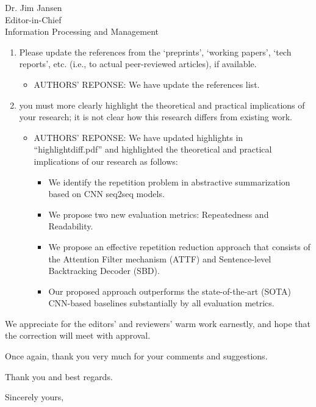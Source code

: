 \documentclass[11pt]{letter} %
\begin{document}
\begin{letter}{Dr. Jim Jansen \\
			Editor-in-Chief  \\
			Information Processing and Management}
\begin{enumerate}
\begin{itemize}
			\end{itemize}
			\item Please update the references from the ‘preprints', ‘working papers’, ‘tech reports’, etc. (i.e., to actual peer-reviewed articles), if available.
			\begin{itemize}
				\item[] AUTHORS' REPONSE: We have update the references list.
			\end{itemize}
			\item you must more clearly highlight the theoretical and practical implications of your research; it is not clear how this research differs from existing work.
			\begin{itemize}
				\item[] AUTHORS' REPONSE: We have updated highlights in ``highlightdiff.pdf'' and highlighted the theoretical and practical implications of our research as follows:
                \begin{itemize}
                \item We identify the repetition problem in abstractive summarization based on CNN seq2seq models.
                \item We propose two new evaluation metrics: Repeatedness and Readability. 
                \item We propose an effective repetition reduction approach that consists of the Attention Filter mechanism (ATTF) and Sentence-level Backtracking Decoder (SBD).
                \item Our proposed approach outperforms the state-of-the-art (SOTA) CNN-based baselines substantially by all evaluation metrics.
                \end{itemize}
            \end{itemize}
		\end{enumerate}
	
	
		We appreciate for the editors' and reviewers' warm work earnestly,
		and hope that the correction will meet with approval.
		
		Once again, thank you very much for  your comments and suggestions.
		
		
		Thank you and best regards.
		
		\closing{Sincerely yours,}
		
		
		
		
	\end{letter}
	
\end{document}
